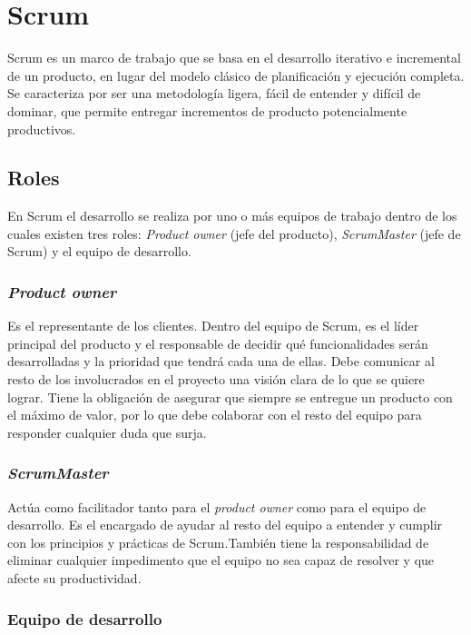 \section{Scrum} \label{sect:Scrum}

Scrum es un marco de trabajo que se basa en el desarrollo iterativo e incremental de un producto, en lugar del modelo clásico de planificación y ejecución completa. \cite{SCRM0} Se caracteriza por ser una metodología ligera, fácil de entender y difícil de dominar, que permite entregar incrementos de producto potencialmente productivos. \cite{SCRM1}

\subsection{Roles} 

En Scrum el desarrollo se realiza por uno o más equipos de trabajo dentro de los cuales existen tres roles: \textit{Product owner} (jefe del producto), \textit{ScrumMaster} (jefe de Scrum) y el equipo de desarrollo. \cite{SCRM12}
 
\subsubsection{\textit{Product owner}}

Es el representante de los clientes. Dentro del equipo de Scrum, es el líder principal del producto y el responsable de decidir qué funcionalidades serán desarrolladas y la prioridad que tendrá cada una de ellas. Debe comunicar al resto de los involucrados en el proyecto una visión clara de lo que se quiere lograr. Tiene la obligación de asegurar que siempre se entregue un producto con el máximo de valor, por lo que debe colaborar con el resto del equipo para responder cualquier duda que surja. \cite{SCRM12}

\subsubsection{\textit{ScrumMaster}}

Actúa como facilitador tanto para el \textit{product owner} como para el equipo de desarrollo. Es el encargado de ayudar al resto del equipo a entender y cumplir con los principios y prácticas de Scrum.También tiene la responsabilidad de eliminar cualquier impedimento que el equipo no sea capaz de resolver y que afecte su productividad. \cite{SCRM12}

\subsubsection{Equipo de desarrollo}

